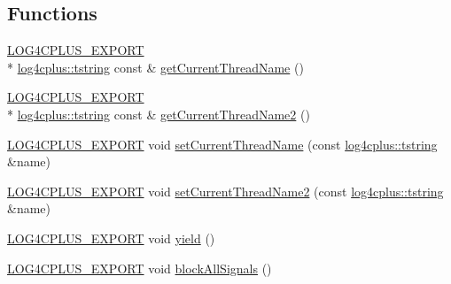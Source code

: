 \subsection*{Functions}
\begin{DoxyCompactItemize}
\item 
\hyperlink{config_8hxx_ab13cb1a5317c245ee2ef4f2bfe0cfb2d}{L\-O\-G4\-C\-P\-L\-U\-S\-\_\-\-E\-X\-P\-O\-R\-T} \\*
\hyperlink{namespacelog4cplus_a3c9287f6ebcddc50355e29d71152117b}{log4cplus\-::tstring} const \& \hyperlink{namespacelog4cplus_1_1thread_a08691494b7efb682286c6c9f335dd89a}{get\-Current\-Thread\-Name} ()
\item 
\hyperlink{config_8hxx_ab13cb1a5317c245ee2ef4f2bfe0cfb2d}{L\-O\-G4\-C\-P\-L\-U\-S\-\_\-\-E\-X\-P\-O\-R\-T} \\*
\hyperlink{namespacelog4cplus_a3c9287f6ebcddc50355e29d71152117b}{log4cplus\-::tstring} const \& \hyperlink{namespacelog4cplus_1_1thread_a148ccdb09942d9c27bf068dded1cfde1}{get\-Current\-Thread\-Name2} ()
\item 
\hyperlink{config_8hxx_ab13cb1a5317c245ee2ef4f2bfe0cfb2d}{L\-O\-G4\-C\-P\-L\-U\-S\-\_\-\-E\-X\-P\-O\-R\-T} void \hyperlink{namespacelog4cplus_1_1thread_af6ba700f025019976e7ffe604ca30d05}{set\-Current\-Thread\-Name} (const \hyperlink{namespacelog4cplus_a3c9287f6ebcddc50355e29d71152117b}{log4cplus\-::tstring} \&name)
\item 
\hyperlink{config_8hxx_ab13cb1a5317c245ee2ef4f2bfe0cfb2d}{L\-O\-G4\-C\-P\-L\-U\-S\-\_\-\-E\-X\-P\-O\-R\-T} void \hyperlink{namespacelog4cplus_1_1thread_a915dc6253407fcc42434c49de5630631}{set\-Current\-Thread\-Name2} (const \hyperlink{namespacelog4cplus_a3c9287f6ebcddc50355e29d71152117b}{log4cplus\-::tstring} \&name)
\item 
\hyperlink{config_8hxx_ab13cb1a5317c245ee2ef4f2bfe0cfb2d}{L\-O\-G4\-C\-P\-L\-U\-S\-\_\-\-E\-X\-P\-O\-R\-T} void \hyperlink{namespacelog4cplus_1_1thread_a6e109610108e1f0de3aa5c3e75dadf18}{yield} ()
\item 
\hyperlink{config_8hxx_ab13cb1a5317c245ee2ef4f2bfe0cfb2d}{L\-O\-G4\-C\-P\-L\-U\-S\-\_\-\-E\-X\-P\-O\-R\-T} void \hyperlink{namespacelog4cplus_1_1thread_a3fcf3d6ab7e22c9ad7593ac6b8eecd13}{block\-All\-Signals} ()
\end{DoxyCompactItemize}


